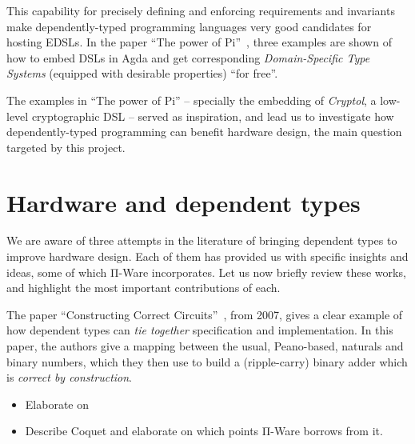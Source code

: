             This capability for precisely defining and enforcing requirements and invariants make
            dependently-typed programming languages very good candidates for hosting \acp{EDSL}.
            In the paper ``The power of Pi''~\cite{power-pi}, three examples are shown of how to
            embed \acp{DSL} in Agda and get corresponding \emph{Domain-Specific Type Systems}
            (equipped with desirable properties) ``for free''.

            The examples in ``The power of Pi'' -- specially the embedding of \emph{Cryptol},
            a low-level cryptographic \ac{DSL} -- served as inspiration,
            and lead us to investigate how dependently-typed programming can benefit hardware
            design, the main question targeted by this project.



    \section{Hardware and dependent types}
    \label{sec:hardware-dtp}

        We are aware of three attempts in the literature of bringing dependent types to improve hardware design.
        Each of them has provided us with specific insights and ideas, some of which Π-Ware incorporates.
        Let us now briefly review these works, and highlight the most important contributions of each.

        The paper ``Constructing Correct Circuits''~\cite{brady-constructing}, from 2007,
        gives a clear example of how dependent types can \emph{tie together} specification and implementation.
        In this paper, the authors give a mapping between the usual, Peano-based, naturals and binary numbers,
        which they then use to build a (ripple-carry) binary adder which is \emph{correct by construction}.

        \begin{itemize}
            \item Elaborate on~\cite{certifying-circuits-cic}
            \item Describe Coquet and elaborate on which points Π-Ware borrows from it.
        \end{itemize}

